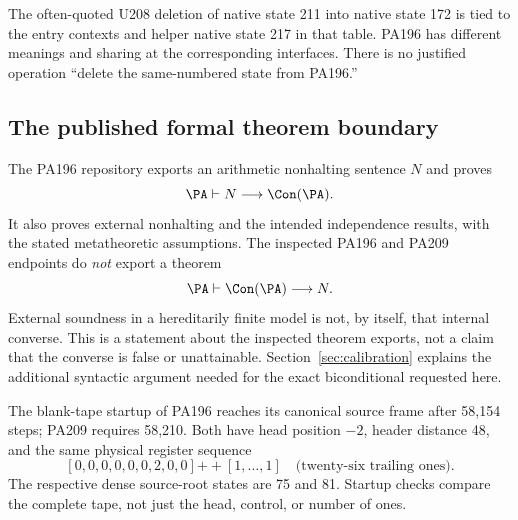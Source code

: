 The often-quoted U208 deletion of native state 211 into native state 172 is tied to the entry contexts and helper native state 217 in that table. PA196 has different meanings and sharing at the corresponding interfaces. There is no justified operation ``delete the same-numbered state from PA196.''

\subsection{The published formal theorem boundary}
The PA196 repository exports an arithmetic nonhalting sentence $N$ and proves\cite{pa196}
\[
 \PA\vdash N\longrightarrow\Con(\PA).
\]
It also proves external nonhalting and the intended independence results, with the stated metatheoretic assumptions. The inspected PA196 and PA209 endpoints do \emph{not} export a theorem
\[
 \PA\vdash\Con(\PA)\longrightarrow N.
\]
External soundness in a hereditarily finite model is not, by itself, that internal converse. This is a statement about the inspected theorem exports, not a claim that the converse is false or unattainable. Section~\ref{sec:calibration} explains the additional syntactic argument needed for the exact biconditional requested here.

The blank-tape startup of PA196 reaches its canonical source frame after 58,154 steps; PA209 requires 58,210. Both have head position $-2$, header distance 48, and the same physical register sequence
\[
 [0,0,0,0,0,0,2,0,0]\mathbin{+\!+}[1,\ldots,1]
 \quad\text{(twenty-six trailing ones).}
\]
The respective dense source-root states are 75 and 81. Startup checks compare the complete tape, not just the head, control, or number of ones.

